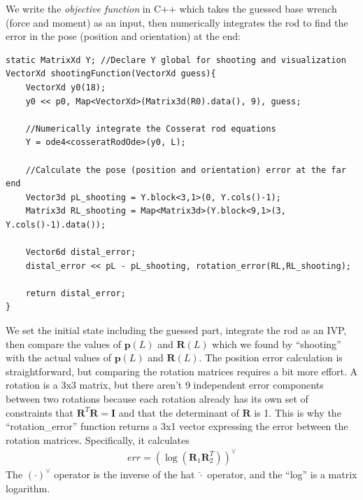 \documentclass[12pt]{article}
\begin{document}
We write the \emph{objective function} in C++ which takes the guessed base wrench (force and moment) as an input, then numerically integrates the rod to find the error in the pose (position and orientation) at the end:
\begin{lstlisting}
static MatrixXd Y; //Declare Y global for shooting and visualization
VectorXd shootingFunction(VectorXd guess){
    VectorXd y0(18);
    y0 << p0, Map<VectorXd>(Matrix3d(R0).data(), 9), guess;

    //Numerically integrate the Cosserat rod equations
    Y = ode4<cosseratRodOde>(y0, L);

    //Calculate the pose (position and orientation) error at the far end
    Vector3d pL_shooting = Y.block<3,1>(0, Y.cols()-1);
    Matrix3d RL_shooting = Map<Matrix3d>(Y.block<9,1>(3, Y.cols()-1).data());

    Vector6d distal_error;
    distal_error << pL - pL_shooting, rotation_error(RL,RL_shooting);

    return distal_error;
}
\end{lstlisting}
We set the initial state including the guessed part, integrate the rod as an IVP, then compare the values of $\boldsymbol{p}(L)$ and $\boldsymbol{R}(L)$ which we found by ``shooting'' with the actual values of $\boldsymbol{p}(L)$ and $\boldsymbol{R}(L)$. The position error calculation is straightforward, but comparing the rotation matrices requires a bit more effort. A rotation is a 3x3 matrix, but there aren't 9 independent error components between two rotations because each rotation already has its own set of constraints that $\boldsymbol{R}^T \boldsymbol{R} = \boldsymbol{I}$ and that the determinant of $\boldsymbol{R}$ is 1. This is why the ``rotation\_error'' function returns a 3x1 vector expressing the error between the rotation matrices. Specifically, it calculates
\begin{align*}
err = \left( \log (\boldsymbol{R}_1 \boldsymbol{R}_2^T) \right)^\vee
\end{align*}
The $(\cdot)^\vee$ operator is the inverse of the hat $\widehat{\cdot}$ operator, and the ``log'' is a matrix logarithm.
\end{document}
